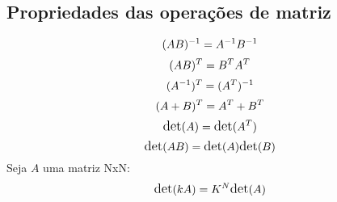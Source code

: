 \documentclass[10pt, a4paper, oneside]{book}
\begin{document}
\subsection{Propriedades das operações de matriz}
\begin{equation*} 
\large{(AB)^{-1} = A^{-1}B^{-1}}\\
\end{equation*}
\begin{equation*} 
\large{(AB)^{T} = B^{T}A^{T}}\\
\end{equation*}
\begin{equation*} 
\large{(A^{-1})^{T} = (A^{T})^{-1}}\\
\end{equation*}
\begin{equation*} 
\large{(A+B)^{T} = A^{T} + B^{T}}\\
\end{equation*}
\begin{equation*} 
\large{\text{det}(A) = \text{det}(A^{T})}\\
\end{equation*}
\begin{equation*} 
\large{\text{det}(AB) = \text{det}(A)\text{det}(B)}\\
\end{equation*}
\large{Seja $A$ uma matriz NxN:}
\begin{equation*} 
\large{\text{det}(kA) = K^N\text{det}(A)}\\
\end{equation*}
\end{document}
